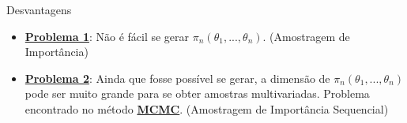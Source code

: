 \documentclass{beamer}
\begin{document}
\begin{frame}{Desvantagens}


\begin{itemize}

\item[] \underline{\textbf{Problema 1}}: Não é fácil se gerar $\pi_n(\theta_1,...,\theta_n)$. (Amostragem de Importância)
\pause 

\vspace{.5cm}
\item[] \underline{\textbf{Problema 2}}: Ainda que fosse possível se gerar, a dimensão de $\pi_n(\theta_1,...,\theta_n)$ pode ser muito grande para se obter amostras multivariadas. Problema encontrado no método \underline{\textbf{MCMC}}. (Amostragem de Importância Sequencial)

\end{itemize}
\end{frame}
\end{document}
